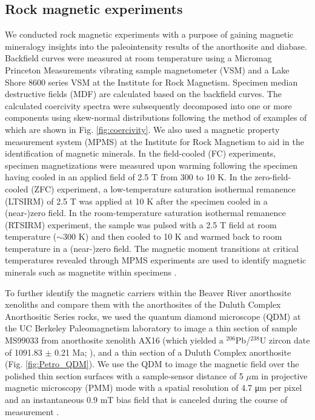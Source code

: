 \documentclass[9pt,twocolumn,twoside,lineno]{pnas-new}
\begin{document}
{\subsection*{Rock magnetic experiments}

We conducted rock magnetic experiments with a purpose of gaining magnetic mineralogy insights into the paleointensity results of the anorthosite and diabase. Backfield curves were measured at room temperature using a Micromag Princeton Measurements vibrating sample magnetometer (VSM) and a Lake Shore 8600 series VSM at the Institute for Rock Magnetism. Specimen median destructive fields (MDF) are calculated based on the backfield curves. The calculated coercivity spectra were subsequently decomposed into one or more components using skew-normal distributions following the method of  \citealp{Maxbauer2016a} examples of which are shown in Fig. \ref{fig:coercivity}. We also used a magnetic property measurement system (MPMS) at the Institute for Rock Magnetism to aid in the identification of magnetic minerals. In the field-cooled (FC) experiments, specimen magnetizations were measured upon warming following the specimen having cooled in an applied field of 2.5 T from 300 to 10 K. In the zero-field-cooled (ZFC) experiment, a low-temperature saturation isothermal remanence (LTSIRM) of 2.5 T was applied at 10 K after the specimen cooled in a (near-)zero field. In the room-temperature saturation isothermal remanence (RTSIRM) experiment, the sample was pulsed with a 2.5 T field at room temperature ($\sim$300 K) and then cooled to 10 K and warmed back to room temperature in a (near-)zero field. The magnetic moment transitions at critical temperatures revealed through MPMS experiments are used to identify magnetic minerals such as magnetite within specimens \cite{Feinberg2015a}. 

To further identify the magnetic carriers within the Beaver River anorthosite xenoliths and compare them with the anorthosites of the Duluth Complex Anorthositic Series rocks, we used the quantum diamond microscope (QDM) at the UC Berkeley Paleomagnetism laboratory to image a thin section of sample MS99033 from anorthosite xenolith AX16 (which yielded a $^{206}$Pb/$^{238}$U zircon date of 1091.83 $\pm$ 0.21 Ma;  \citealp{Zhang2021b}), and a thin section of a Duluth Complex anorthosite (Fig. \ref{fig:Petro_QDM}). We use the QDM to image the magnetic field over the polished thin section surfaces with a sample-sensor distance of 5 $\mu$m in projective magnetic microscopy (PMM) mode with a spatial resolution of 4.7 μm per pixel and an instantaneous 0.9 mT bias field that is canceled during the course of measurement \cite{Glenn2017a}.
}
\end{document}
